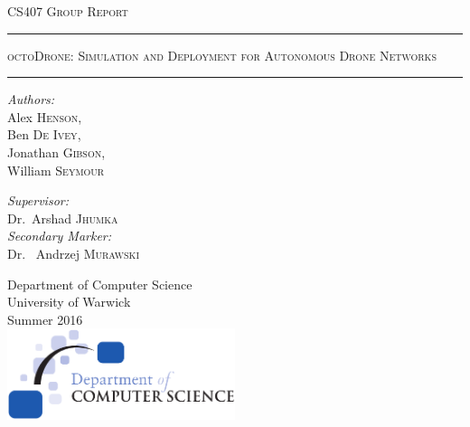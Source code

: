 \documentclass[10pt,a4paper,twoside]{report}
\begin{document}
\begin{titlepage}
\begin{center}

\textsc{\LARGE CS407 Group Report}\\[1.5cm]
\vspace{1.5cm}

\hrule
\vspace{0.2cm}
\textsc{\LARGE octoDrone: Simulation and Deployment for Autonomous Drone Networks}\\
\vspace{0.2cm}
\hrule

\vspace{1.5cm}
\noindent
\begin{minipage}{0.4\textwidth}
	\begin{flushleft} \large
		\emph{Authors:}\\
		Alex \textsc{Henson}, \\ Ben \textsc{De Ivey}, \\ Jonathan \textsc{Gibson}, \\ William \textsc{Seymour} 
	\end{flushleft}
\end{minipage}%
\begin{minipage}{0.4\textwidth}
	\begin{flushright} \large
		\emph{Supervisor:} \\
		Dr.~Arshad \textsc{Jhumka} \\
		\emph{Secondary Marker:} \\
		Dr.~ Andrzej \textsc{Murawski} 
	\end{flushright}
\end{minipage}
\vfill
\large Department of Computer Science\\
\large University of Warwick\\
\large Summer 2016\\
\vfill
\includegraphics[width=0.50\textwidth]{img/dcslogo.png}~\\[1cm]
\end{center}
\end{titlepage}

\end{document}
